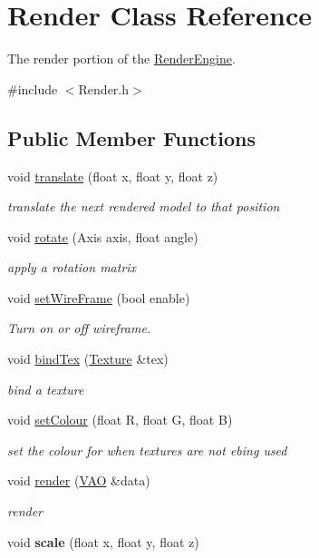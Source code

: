 \hypertarget{class_render}{\section{Render Class Reference}
\label{class_render}
}


The render portion of the \hyperlink{class_render_engine}{Render\-Engine}.  




{\ttfamily \#include $<$Render.\-h$>$}

\subsection*{Public Member Functions}
\begin{DoxyCompactItemize}
\item 
void \hyperlink{class_render_a3685dee198801656d82b3597c0995a5f}{translate} (float x, float y, float z)
\begin{DoxyCompactList}\small\item\em translate the next rendered model to that position \end{DoxyCompactList}\item 
void \hyperlink{class_render_ac4c31c973bb8a82f965cc5a8c8d81f22}{rotate} (Axis axis, float angle)
\begin{DoxyCompactList}\small\item\em apply a rotation matrix \end{DoxyCompactList}\item 
void \hyperlink{class_render_a425bc40a7f1af78b41bc913ab9613cd4}{set\-Wire\-Frame} (bool enable)
\begin{DoxyCompactList}\small\item\em Turn on or off wireframe. \end{DoxyCompactList}\item 
void \hyperlink{class_render_ab498aa4c187f5c3d4e1479b94d86f161}{bind\-Tex} (\hyperlink{class_texture}{Texture} \&tex)
\begin{DoxyCompactList}\small\item\em bind a texture \end{DoxyCompactList}\item 
void \hyperlink{class_render_a05951fdb27e9ad1fbc28be2c682aaf12}{set\-Colour} (float R, float G, float B)
\begin{DoxyCompactList}\small\item\em set the colour for when textures are not ebing used \end{DoxyCompactList}\item 
void \hyperlink{class_render_a09b3ee0ca3c35661a942ba46d3aedd75}{render} (\hyperlink{class_v_a_o}{V\-A\-O} \&data)
\begin{DoxyCompactList}\small\item\em render \end{DoxyCompactList}\item 
\hypertarget{class_render_a024911a8a1f04184131590b389df3f5e}{void {\bfseries scale} (float x, float y, float z)}\label{class_render_a024911a8a1f04184131590b389df3f5e}

\end{DoxyCompactItemize}


